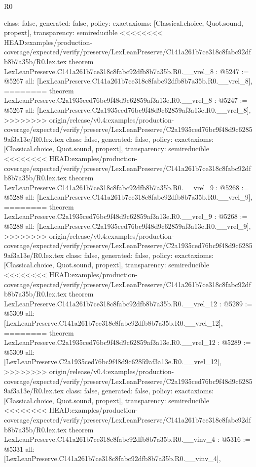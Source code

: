 \begin{lexlean}{R0}
\begin{coremodule}
{{{{{{{{{{{{{{{{{{{{{{{{{{{{{{{{{{{{{{{{{{{{{{{{{{{{{{{{{{{{{{{{{{{{{{{  class: false,
  generated: false,
  policy: exact{axioms: [Classical.choice, Quot.sound, propext]},
  transparency: semireducible
}
<<<<<<<< HEAD:examples/production-coverage/expected/verify/preserve/LexLeanPreserve/C141a261b7ce318c8fabc92dfb8b7a35b/R0.lex.tex
theorem LexLeanPreserve.C141a261b7ce318c8fabc92dfb8b7a35b.R0.__vrel_8 : @5247 := @5267 {
  all: [LexLeanPreserve.C141a261b7ce318c8fabc92dfb8b7a35b.R0.__vrel_8],
========
theorem LexLeanPreserve.C2a1935ced76bc9f48d9c62859af3a13e.R0.__vrel_8 : @5247 := @5267 {
  all: [LexLeanPreserve.C2a1935ced76bc9f48d9c62859af3a13e.R0.__vrel_8],
>>>>>>>> origin/release/v0.4:examples/production-coverage/expected/verify/preserve/LexLeanPreserve/C2a1935ced76bc9f48d9c62859af3a13e/R0.lex.tex
  class: false,
  generated: false,
  policy: exact{axioms: [Classical.choice, Quot.sound, propext]},
  transparency: semireducible
}
<<<<<<<< HEAD:examples/production-coverage/expected/verify/preserve/LexLeanPreserve/C141a261b7ce318c8fabc92dfb8b7a35b/R0.lex.tex
theorem LexLeanPreserve.C141a261b7ce318c8fabc92dfb8b7a35b.R0.__vrel_9 : @5268 := @5288 {
  all: [LexLeanPreserve.C141a261b7ce318c8fabc92dfb8b7a35b.R0.__vrel_9],
========
theorem LexLeanPreserve.C2a1935ced76bc9f48d9c62859af3a13e.R0.__vrel_9 : @5268 := @5288 {
  all: [LexLeanPreserve.C2a1935ced76bc9f48d9c62859af3a13e.R0.__vrel_9],
>>>>>>>> origin/release/v0.4:examples/production-coverage/expected/verify/preserve/LexLeanPreserve/C2a1935ced76bc9f48d9c62859af3a13e/R0.lex.tex
  class: false,
  generated: false,
  policy: exact{axioms: [Classical.choice, Quot.sound, propext]},
  transparency: semireducible
}
<<<<<<<< HEAD:examples/production-coverage/expected/verify/preserve/LexLeanPreserve/C141a261b7ce318c8fabc92dfb8b7a35b/R0.lex.tex
theorem LexLeanPreserve.C141a261b7ce318c8fabc92dfb8b7a35b.R0.__vrel_12 : @5289 := @5309 {
  all: [LexLeanPreserve.C141a261b7ce318c8fabc92dfb8b7a35b.R0.__vrel_12],
========
theorem LexLeanPreserve.C2a1935ced76bc9f48d9c62859af3a13e.R0.__vrel_12 : @5289 := @5309 {
  all: [LexLeanPreserve.C2a1935ced76bc9f48d9c62859af3a13e.R0.__vrel_12],
>>>>>>>> origin/release/v0.4:examples/production-coverage/expected/verify/preserve/LexLeanPreserve/C2a1935ced76bc9f48d9c62859af3a13e/R0.lex.tex
  class: false,
  generated: false,
  policy: exact{axioms: [Classical.choice, Quot.sound, propext]},
  transparency: semireducible
}
<<<<<<<< HEAD:examples/production-coverage/expected/verify/preserve/LexLeanPreserve/C141a261b7ce318c8fabc92dfb8b7a35b/R0.lex.tex
theorem LexLeanPreserve.C141a261b7ce318c8fabc92dfb8b7a35b.R0.__vinv_4 : @5316 := @5331 {
  all: [LexLeanPreserve.C141a261b7ce318c8fabc92dfb8b7a35b.R0.__vinv_4],
}}}}}}}}}}}}}}}}}}}}}}}}}}}}}}}}}}}}}}}}}}}}}}}}}}}}}}}}}}}}}}}}}}}}}}}}}}
\end{coremodule}
\end{lexlean}
